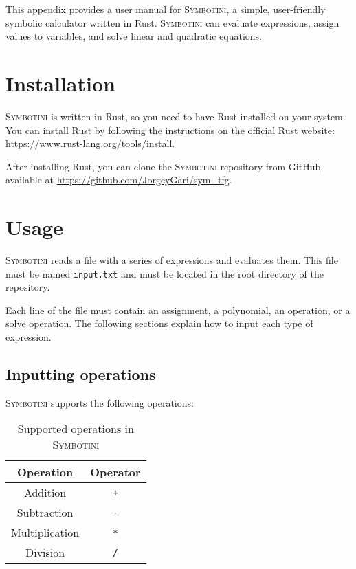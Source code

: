 This appendix provides a user manual for \textsc{Symbotini}, a simple, user-friendly symbolic calculator written in Rust. \textsc{Symbotini} can evaluate expressions, assign values to variables, and solve linear and quadratic equations. 

\section{Installation}

\textsc{Symbotini} is written in Rust, so you need to have Rust installed on your system. You can install Rust by following the instructions on the official Rust website: \url{https://www.rust-lang.org/tools/install}.

After installing Rust, you can clone the \textsc{Symbotini} repository from GitHub, available at \url{https://github.com/JorgeyGari/sym_tfg}.

\section{Usage}

\textsc{Symbotini} reads a file with a series of expressions and evaluates them. This file must be named \texttt{input.txt} and must be located in the root directory of the repository.

Each line of the file must contain an assignment, a polynomial, an operation, or a solve operation. The following sections explain how to input each type of expression.

\subsection{Inputting operations}

\textsc{Symbotini} supports the following operations:

\begin{table}[H]
    \centering
    \begin{tabular}{|c|c|}
        \hline
        \textbf{Operation} & \textbf{Operator} \\
        \hline
        Addition          & \texttt{+}      \\
        Subtraction       & \texttt{-}      \\
        Multiplication    & \texttt{*}      \\
        Division          & \texttt{/}      \\
        \hline
    \end{tabular}
    \caption{Supported operations in \textsc{Symbotini}}
\end{table}

